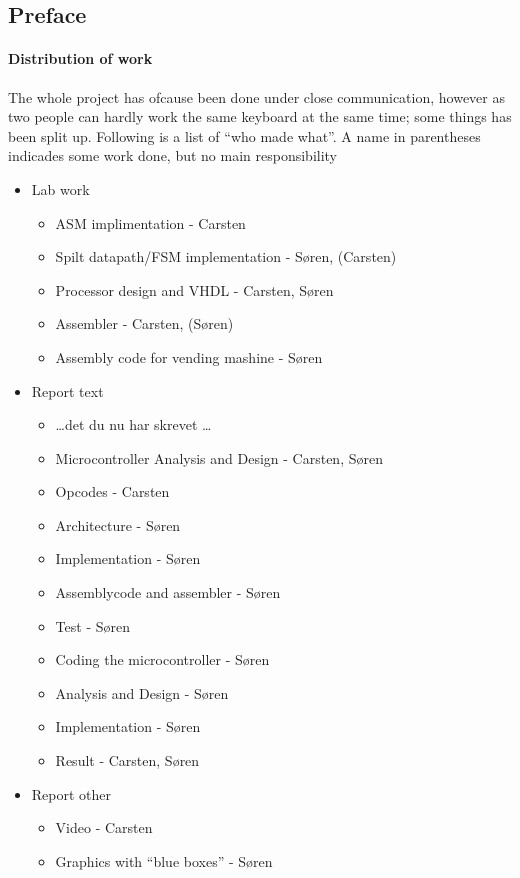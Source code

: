 \subsection*{Preface}

\paragraph{Distribution of work}
The whole project has ofcause been done under close communication, however as
two people can hardly work the same keyboard at the same time; some things has
been split up. Following is a list of ``who made what''. A name in parentheses
indicades some work done, but no main responsibility
\begin{itemize}
  \item Lab work
  \begin{itemize}
    \item ASM implimentation - Carsten
    \item Spilt datapath/FSM implementation - S\o ren, (Carsten)
    
    \item Processor design and VHDL - Carsten, S\o ren
    \item Assembler - Carsten, (S\o ren)
    \item Assembly code for vending mashine - S\o ren
  \end{itemize}
  \item Report text
  \begin{itemize}
    \item \ldots det du nu har skrevet \ldots
    
    \item Microcontroller Analysis and Design - Carsten, S\o ren
    \item Opcodes - Carsten
    \item Architecture - S\o ren
    \item Implementation - S\o ren
    \item Assemblycode and assembler - S\o ren
    \item Test - S\o ren
    \item Coding the microcontroller - S\o ren
    \item Analysis and Design - S\o ren
    \item Implementation - S\o ren
    \item Result - Carsten, S\o ren
  \end{itemize}
  \item Report other
  \begin{itemize}
    \item Video - Carsten
    \item Graphics with ``blue boxes'' - S\o ren
  \end{itemize}
\end{itemize}
